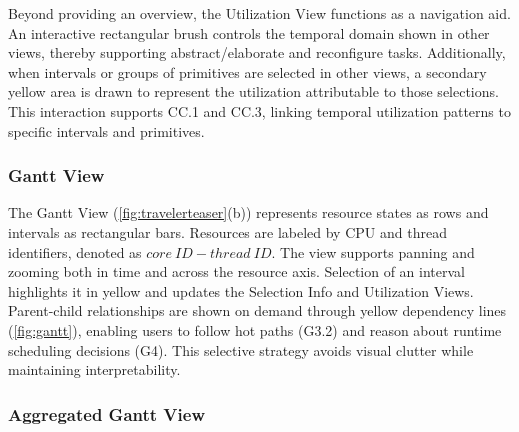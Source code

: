 \begin{refsection}

Beyond providing an overview, the Utilization View functions as a navigation aid. An interactive rectangular brush controls the temporal domain shown in other views, thereby supporting abstract/elaborate and reconfigure tasks. Additionally, when intervals or groups of primitives are selected in other views, a secondary yellow area is drawn to represent the utilization attributable to those selections. This interaction supports CC.1 and CC.3, linking temporal utilization patterns to specific intervals and primitives.

\subsubsection{Gantt View} 


The Gantt View (\autoref{fig:travelerteaser}(b)) represents resource states as rows and intervals as rectangular bars. Resources are labeled by CPU and thread identifiers, denoted as $core\ ID-thread\ ID$. The view supports panning and zooming both in time and across the resource axis. Selection of an interval highlights it in yellow and updates the Selection Info and Utilization Views. Parent-child relationships are shown on demand through yellow dependency lines (\autoref{fig:gantt}), enabling users to follow hot paths (G3.2) and reason about runtime scheduling decisions (G4). This selective strategy avoids visual clutter while maintaining interpretability.

\subsubsection{Aggregated Gantt View} 


\end{refsection}
